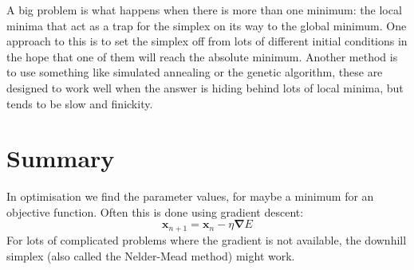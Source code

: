 \documentclass[12pt]{article}
\begin{document}
A big problem is what happens when there is more than one minimum: the
local minima that act as a trap for the simplex on its way to the
global minimum. One approach to this is to set the simplex off from
lots of different initial conditions in the hope that one of them will
reach the absolute minimum. Another method is to use something like
simulated annealing or the genetic algorithm, these are designed to
work well when the answer is hiding behind lots of local minima, but
tends to be slow and finickity.


\section*{Summary}
In optimisation we find the parameter values, for maybe a minimum for
an objective function. Often this is done using gradient descent:
\begin{equation}
\mathbf{x}_{n+1}=\mathbf{x}_n-\eta \mathbf{\nabla}E
\end{equation}
For lots of complicated problems where the
gradient is not available, the downhill simplex (also called the Nelder-Mead method) might work.
\end{document}
